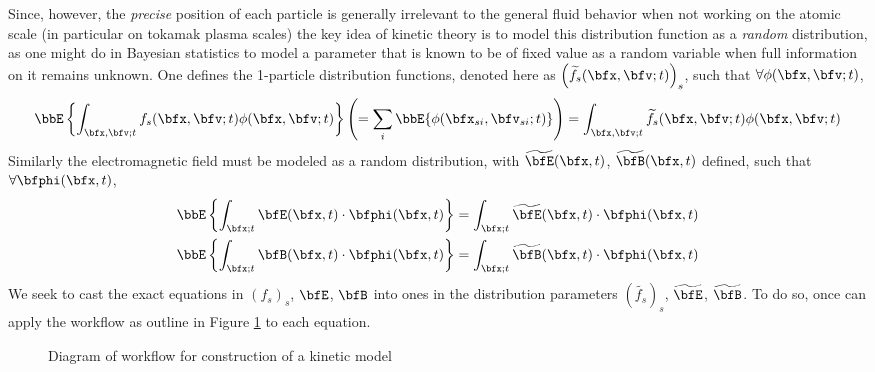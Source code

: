     Since, however, the \emph{precise} position of each particle is generally irrelevant to the general fluid behavior when not working on the atomic scale (in particular on tokamak plasma scales) the key idea of kinetic theory is to model this distribution function as a \emph{random} distribution, as one might do in Bayesian statistics to model a parameter that is known to be of fixed value as a random variable when full information on it remains unknown. One defines the 1-particle distribution functions, denoted here as $\left(\widetilde{f_{s}}(\bfx, \bfv; t)\right)_{s}$, such that $\forall \phi(\bfx, \bfv; t)$,
    \begin{equation}
        \bbE\left\{\int_{\bfx, \bfv; t}f_{s}(\bfx, \bfv; t)\phi(\bfx, \bfv; t)\right\}
        \left(=  \sum_{i}\bbE\{\phi(\bfx_{si}, \bfv_{si}; t)\}\right)
        =  \int_{\bfx, \bfv; t}\widetilde{f_{s}}(\bfx, \bfv; t)\phi(\bfx, \bfv;t )
    \end{equation}
    Similarly the electromagnetic field must be modeled as a random distribution, with $\widetilde{\bfE}(\bfx, t)$, $\widetilde{\bfB}(\bfx, t)$ defined, such that $\forall \bfphi(\bfx, t)$,
    \begin{align}
        \bbE\left\{\int_{\bfx; t}\bfE(\bfx, t)\cdot\bfphi(\bfx, t)\right\}  =  \int_{\bfx; t}\widetilde{\bfE}(\bfx, t)\cdot\bfphi(\bfx, t)  \\ 
        \bbE\left\{\int_{\bfx; t}\bfB(\bfx, t)\cdot\bfphi(\bfx, t)\right\}  =  \int_{\bfx; t}\widetilde{\bfB}(\bfx, t)\cdot\bfphi(\bfx, t)
    \end{align}
    We seek to cast the exact equations in $(f_{s})_{s}$, $\bfE$, $\bfB$ into ones in the distribution parameters $\left(\widetilde{f_{s}}\right)_{s}$, $\widetilde{\bfE}$, $\widetilde{\bfB}$. To do so, once can apply the workflow as outline in Figure \ref{fig:kinetic model construction workflow} to each equation.
    \begin{figure}[!ht]
        \centering
        \caption{Diagram of workflow for construction of a kinetic model}
        \label{fig:kinetic model construction workflow}
    \end{figure}

